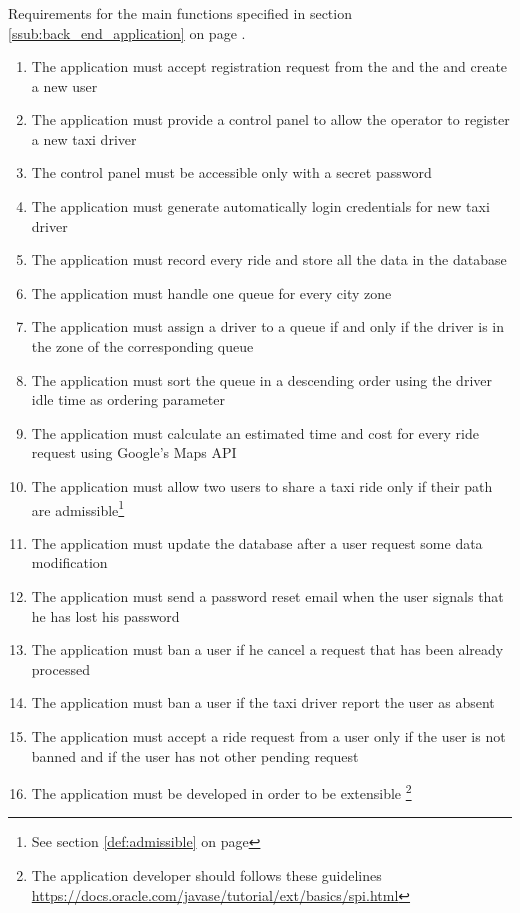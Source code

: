 \subsubsection{}
\label{subs:backend_requirements}
Requirements for the main functions specified in section \ref{ssub:back_end_application} on page \pageref{ssub:back_end_application}.
\begin{enumerate}[resume*]
	\item The application must accept registration request from the  and the  and create a new user
	\item The application must provide a control panel to allow the operator to register a new taxi driver
	\item The control panel must be accessible only with a secret password
	\item The application must generate automatically login credentials for new taxi driver
	\item The application must record every ride and store all the data in the database
	\item The application must handle one queue for every city zone
	\item The application must assign a driver to a queue if and only if the driver is in the zone of the corresponding queue
	\item The application must sort the queue in a descending order using the driver idle time as ordering parameter
	\item The application must calculate an estimated time and cost for every ride request using Google's Maps API
	\item The application must allow two users to share a taxi ride only if their path are admissible\footnote{See section \ref{def:admissible} on page \pageref{def:admissible}}
	\item The application must update the database after a user request some data modification
	\item The application must send a password reset email when the user signals that he has lost his password
	\item The application must ban a user if he cancel a request that has been already processed
	\item The application must ban a user if the taxi driver report the user as absent
	\item The application must accept a ride request from a user only if the user is not banned and if the user has not other pending request
	\item The application must be developed in order to be extensible \footnote{The application developer should follows these guidelines \url{https://docs.oracle.com/javase/tutorial/ext/basics/spi.html}}


\end{enumerate}

